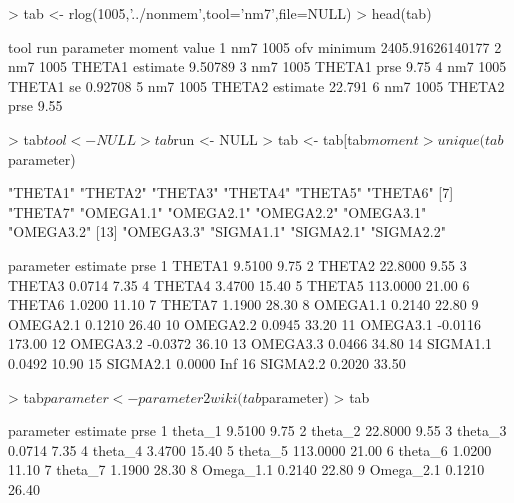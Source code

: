 \begin{Schunk}
\begin{Sinput}
> tab <- rlog(1005,'../nonmem',tool='nm7',file=NULL)
> head(tab)
\end{Sinput}
\begin{Soutput}
  tool  run parameter   moment            value
1  nm7 1005       ofv  minimum 2405.91626140177
2  nm7 1005    THETA1 estimate          9.50789
3  nm7 1005    THETA1     prse             9.75
4  nm7 1005    THETA1       se          0.92708
5  nm7 1005    THETA2 estimate           22.791
6  nm7 1005    THETA2     prse             9.55
\end{Soutput}
\begin{Sinput}
> tab$tool <- NULL
> tab$run <- NULL
> tab <- tab[tab$moment %in% c('estimate','prse'),]
> unique(tab$parameter)
\end{Sinput}
\begin{Soutput}
 [1] "THETA1"   "THETA2"   "THETA3"   "THETA4"   "THETA5"   "THETA6"  
 [7] "THETA7"   "OMEGA1.1" "OMEGA2.1" "OMEGA2.2" "OMEGA3.1" "OMEGA3.2"
[13] "OMEGA3.3" "SIGMA1.1" "SIGMA2.1" "SIGMA2.2"
\end{Soutput}
\begin{Soutput}
   parameter estimate   prse
1     THETA1   9.5100   9.75
2     THETA2  22.8000   9.55
3     THETA3   0.0714   7.35
4     THETA4   3.4700  15.40
5     THETA5 113.0000  21.00
6     THETA6   1.0200  11.10
7     THETA7   1.1900  28.30
8   OMEGA1.1   0.2140  22.80
9   OMEGA2.1   0.1210  26.40
10  OMEGA2.2   0.0945  33.20
11  OMEGA3.1  -0.0116 173.00
12  OMEGA3.2  -0.0372  36.10
13  OMEGA3.3   0.0466  34.80
14  SIGMA1.1   0.0492  10.90
15  SIGMA2.1   0.0000    Inf
16  SIGMA2.2   0.2020  33.50
\end{Soutput}
\begin{Sinput}
> tab$parameter <- parameter2wiki(tab$parameter)
> tab
\end{Sinput}
\begin{Soutput}
    parameter estimate   prse
1    theta_1    9.5100   9.75
2    theta_2   22.8000   9.55
3    theta_3    0.0714   7.35
4    theta_4    3.4700  15.40
5    theta_5  113.0000  21.00
6    theta_6    1.0200  11.10
7    theta_7    1.1900  28.30
8  Omega_1.1    0.2140  22.80
9  Omega_2.1    0.1210  26.40

\end{Soutput}
\end{Schunk}
